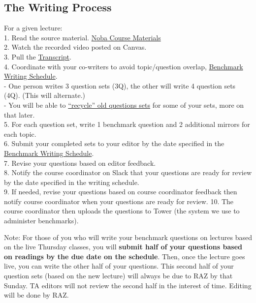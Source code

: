 \documentclass[
]{article}
\begin{document}
\hypertarget{the-writing-process}{%
\subsection{The Writing Process}\label{the-writing-process}}

For a given lecture:\\
1. Read the source material. \href{https://utexas.instructure.com/courses/1425333}{Noba Course Materials}\\
2. Watch the recorded video posted on Canvas.\\
3. Pull the \href{https://utexas.app.box.com/s/gv30palwx7zhqfk43vgvy8450ci0qz66/folder/333986317433}{Transcript}.\\
4. Coordinate with your co-writers to avoid topic/question overlap, \href{https://docs.google.com/spreadsheets/d/1hingHbcfSHpUr1Km8NF4nnrDgw5ivD6b/edit?gid=602524248\#gid=602524248}{Benchmark Writing Schedule}.\\
- One person writes 3 question sets (3Q), the other will write 4 question sets (4Q). (This will alternate.)\\
- You will be able to \protect\hyperlink{recycling-benchmark-questions}{``recycle'' old questions sets} for some of your sets, more on that later.\\
5. For each question set, write 1 benchmark question and 2 additional mirrors for each topic.\\
6. Submit your completed sets to your editor by the date specified in the \href{https://docs.google.com/spreadsheets/d/1hingHbcfSHpUr1Km8NF4nnrDgw5ivD6b/edit?gid=602524248\#gid=602524248}{Benchmark Writing Schedule}.\\
7. Revise your questions based on editor feedback.\\
8. Notify the course coordinator on Slack that your questions are ready for review by the date specified in the writing schedule.\\
9. If needed, revise your questions based on course coordinator feedback then notify course coordinator when your questions are ready for review.
10. The course coordinator then uploads the questions to Tower (the system we use to administer benchmarks).

Note: For those of you who will write your benchmark questions on lectures based on the live Thursday classes, you will \textbf{submit half of your questions based on readings by the due date on the schedule}. Then, once the lecture goes live, you can write the other half of your questions. This second half of your question sets (based on the new lecture) will always be due to RAZ by that Sunday. TA editors will not review the second half in the interest of time. Editing will be done by RAZ.
\end{document}
